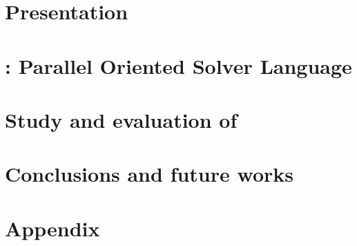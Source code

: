 \documentclass[a4paper,11pt,twoside,parskip=half,numbers=noenddot,bibliography=totocnumbered,listof = totoc]{scrbook}
\begin{document}

\frontmatter
%

\cleardoublepage
%

\cleardoublepage
\dominitoc
\tableofcontents
%
%
%

\mainmatter

\part{Presentation}



\part{\posl{}: Parallel Oriented Solver Language}

\part{Study and evaluation of \posl}

%
\part{Conclusions and future works}

%

\footnotesize
{} %

\normalsize

\appendix
%

\part{Appendix}





%
\end{document}
